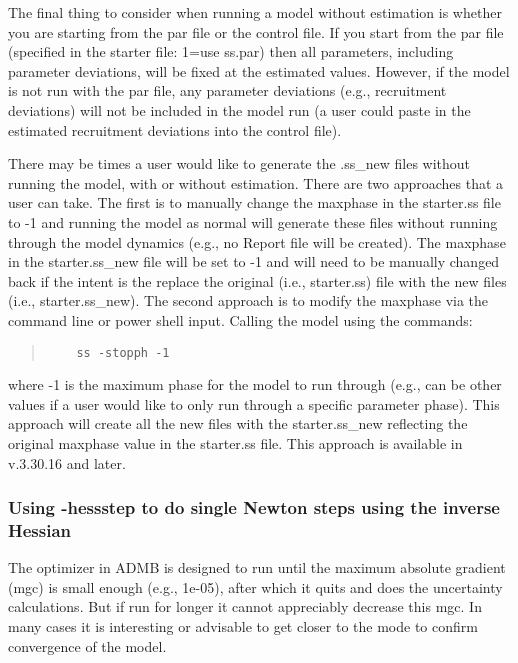 The final thing to consider when running a model without estimation is whether you are starting from the par file or the control file.  If you start from the par file (specified in the starter file: 1=use ss.par) then all parameters, including parameter deviations, will be fixed at the estimated values.  However, if the model is not run with the par file, any parameter deviations (e.g., recruitment deviations) will not be included in the model run (a user could paste in the estimated recruitment deviations into the control file). 

There may be times a user would like to generate the .ss\_new files without running the model, with or without estimation. There are two approaches that a user can take.  The first is to manually change the maxphase in the starter.ss file to -1 and running the model as normal will generate these files without running through the model dynamics (e.g., no Report file will be created). The maxphase in the starter.ss\_new file will be set to -1 and will need to be manually changed back if the intent is the replace the original (i.e., starter.ss) file with the new files (i.e., starter.ss\_new).  The second approach is to modify the maxphase via the command line or power shell input. Calling the model using the commands:

\begin{quote}
	\begin{verbatim}
	ss -stopph -1
	\end{verbatim}
\end{quote}  

where -1 is the maximum phase for the model to run through (e.g., can be other values if a user would like to only run through a specific parameter phase). This approach will create all the new files with the starter.ss\_new reflecting the original maxphase value in the starter.ss file. This approach is available in v.3.30.16 and later.

\hypertarget{hess-step}{}
\subsubsection{Using -hess{\textunderscore}step to do single Newton steps using the inverse Hessian}

The optimizer in ADMB is designed to run until the maximum absolute gradient (mgc) is small enough (e.g., 1e-05), after which it quits and does the uncertainty calculations. But if run for longer it cannot appreciably decrease this mgc. In many cases it is interesting or advisable to get closer to the mode to confirm convergence of the model. 

